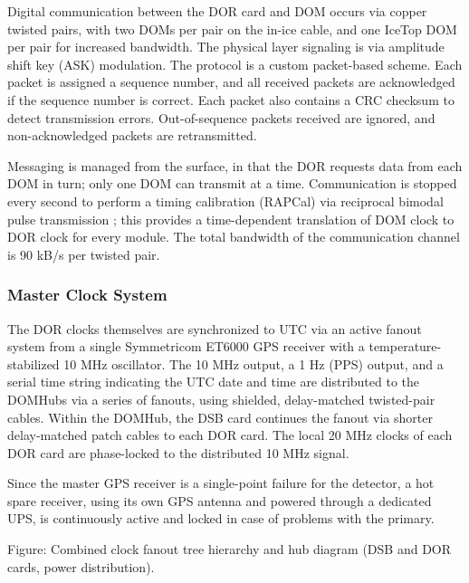 Digital communication between the DOR card and DOM occurs via copper
twisted pairs, with two DOMs per pair on the in-ice cable, and one IceTop
DOM per pair for increased bandwidth.  The physical
layer signaling is via amplitude shift key (ASK) modulation.  The protocol
is a custom packet-based scheme.  Each packet is assigned a sequence 
number, and all received packets are acknowledged if the sequence number is
correct.  Each packet also contains a CRC checksum to detect transmission
errors.  Out-of-sequence packets received are ignored, and non-acknowledged
packets are retransmitted.  

Messaging is managed from the surface, in that the DOR requests data
from each DOM in turn; only one DOM can transmit at a time.  Communication
is stopped every second to perform a timing calibration (RAPCal) via
reciprocal bimodal pulse transmission \cite{ref:domdaq}; this provides a
time-dependent translation of DOM clock to DOR clock for every module.  The
total bandwidth of the communication channel is 90 kB/s per twisted pair.  




\subsubsection{\label{sect:online:master_clock}Master Clock System}

The DOR clocks themselves are synchronized to UTC via an active fanout
system from a single Symmetricom ET6000 GPS receiver with a
temperature-stabilized 10 MHz oscillator.  The 10 MHz output, a 1 Hz (PPS)
output, and a serial time string indicating the UTC date and time are distributed
to the DOMHubs via a series of fanouts, using shielded, delay-matched
twisted-pair cables.  Within the DOMHub, the DSB card continues the fanout
via shorter delay-matched patch cables to each DOR card.  The local 20 MHz
clocks of each DOR card are phase-locked to the distributed 10 MHz signal.

Since the master GPS receiver is a single-point failure for the detector, a
hot spare receiver, using its own GPS antenna and powered through a
dedicated UPS, is continuously active and locked in case of problems with
the primary.  

Figure: Combined clock fanout tree hierarchy and hub diagram (DSB and DOR
cards, power distribution).

